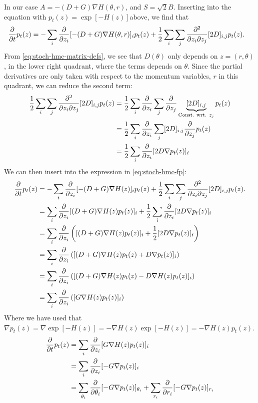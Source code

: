In our case $A = -(D+G)\nabla H(\theta, r)$, and $S = \sqrt{2}B$.
Inserting into the equation with $p_t(z) = \exp[-H(z)]$above, we find that
\begin{align} \label{eq:stoch-hmc-fp}
    \pdv{t} p_t(z) &= - \sum_{i} \pdv{z_i} [ -(D+G)\nabla H(\theta, r)]_i p_t(z) 
    + \frac{1}{2}\sum_{i}\sum_{j}\pdv{}{z_i}{z_j}[2D]_{i,j}p_t(z). 
\end{align}
From \cref{eq:stoch-hmc-matrix-defs}, we see that $D(\theta)$ only depends on $z = (r, \theta)$, in the lower right quadrant, where the terms depends on $\theta$.
Since the partial derivatives are only taken with respect to the momentum variables, $r$ in this quadrant, we can reduce the second term:
\begin{align*}
    \frac{1}{2}\sum_{i}\sum_{j}\pdv{}{z_i}{z_j}[2D]_{i,j}p_t(z)
    &= \frac{1}{2}\sum_{i}\pdv{z_i}\sum_{j}\pdv{z_j}\underbrace{[2D]_{i,j}}_{\text{Const. wrt. $z_j$}}p_t(z) \\
    &= \frac{1}{2}\sum_{i}\pdv{z_i}\sum_{j}[2D]_{i,j}\pdv{z_j}p_t(z)\\
    &= \frac{1}{2}\sum_{i}\pdv{z_i}[2D \nabla p_t(z)]_{i}
\end{align*}
We can then insert into the expression in \cref{eq:stoch-hmc-fp}:
\begin{align*} 
    \pdv{t} p_t(z) &= - \sum_{i} \pdv{z_i} [ -(D+G)\nabla H(z)]_i p_t(z) 
    + \frac{1}{2}\sum_{i}\sum_{j}\pdv{}{z_i}{z_j}[2D]_{i,j}p_t(z). \\
    &=  \sum_{i} \pdv{z_i} [ (D+G)\nabla H(z)p_t(z)]_i 
    + \frac{1}{2}\sum_{i}\pdv{z_i}[2D \nabla p_t(z)]_{i} \\
    &=  \sum_{i} \pdv{z_i} \left([ (D+G)\nabla H(z)p_t(z)]_i 
    + \frac{1}{2}[2D \nabla p_t(z)]_{i}\right) \\
    &=  \sum_{i} \pdv{z_i} \left([ (D+G)\nabla H(z)p_t(z) 
    + D \nabla p_t(z)]_{i}\right) \\
    &=  \sum_{i} \pdv{z_i} \left([ (D+G)\nabla H(z)p_t(z) 
    - D \nabla H(z) p_t(z)]_{i}\right) \\
    &=  \sum_{i} \pdv{z_i} \left([ G\nabla H(z)p_t(z)]_i \right) 
\end{align*}
Where we have used that $\nabla p_t(z) = \nabla \exp[-H(z)]= -\nabla H(z) \exp[-H(z)] =  -\nabla H(z) p_t(z)$. 
\begin{align}
    \pdv{t} p_t(z) &= \sum_{i} \pdv{z_i} [ G\nabla H(z)p_t(z)]_i \\
    &= \sum_{i} \pdv{z_i} [ -G\nabla p_t(z)]_i \\
    &= \sum_{\theta_i} \pdv{\theta_i} [ -G\nabla p_t(z)]_{\theta_i}
    + \sum_{r_i} \pdv{r_i} [ -G\nabla p_t(z)]_{r_i}
\end{align}
